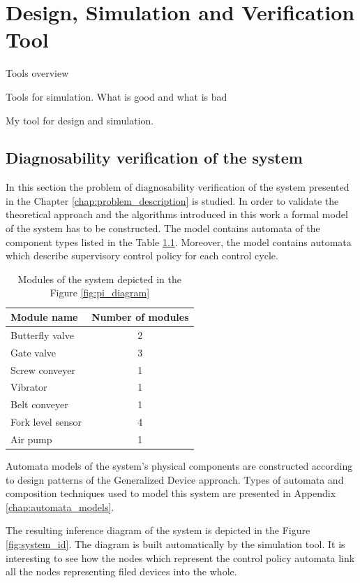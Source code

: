 \chapter{Design, Simulation and Verification Tool}
\label{chap:simulation}

Tools overview

Tools for simulation. What is good and what is bad

My tool for design and simulation.


\section{Diagnosability verification of the system}

In this section the problem of diagnosability verification of the system
presented in the Chapter \ref{chap:problem_description} is studied. In order to
validate the theoretical approach and the algorithms introduced in this work a
formal model of the system has to be constructed. The model contains automata
of the component types listed in the Table \ref{tbl:system_modules}.
Moreover, the model contains automata which describe supervisory control
policy for each control cycle. 

\begin{table}[!ht]
\caption{Modules of the system depicted in the Figure \ref{fig:pi_diagram}}
\centering
	\begin{tabular}{l c}
	\\	
	Module name & Number of modules \\
	\hline
	Butterfly valve	& 2 \\
	Gate valve	& 3 \\
	Screw conveyer	& 1 \\
	Vibrator		& 1 \\
	Belt conveyer	& 1 \\
	Fork level sensor	& 4 \\
	Air pump	& 1 \\
	\hline
	\end{tabular}
	\label{tbl:system_modules}
\end{table}

Automata models of the system's physical components are constructed according to
design patterns of the Generalized Device approach. Types of automata 
and composition techniques used to model this system are presented in
Appendix \ref{chap:automata_models}. 

The resulting inference diagram of the system is depicted in the Figure
\ref{fig:system_id}. The diagram is built automatically by the simulation tool.
It is interesting to see how the nodes which represent the control policy
automata link all the nodes representing filed devices into the whole.

